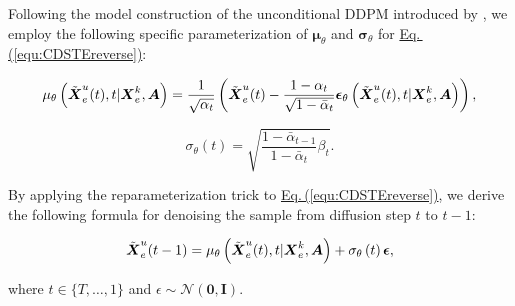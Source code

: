 \documentclass[a4paper,fleqn,12pt]{cas-sc}
\begin{document}
Following the model construction of the unconditional DDPM introduced by \cite{ho2020denoising}, we employ the following specific parameterization of $\boldsymbol{\mu}_{\theta}$ and $\boldsymbol{\sigma}_{\theta}$ for \hyperref[equ:CDSTEreverse]{Eq.\,(\ref{equ:CDSTEreverse})}:
\begin{linenomath*}
\begin{equation}\mu_\theta\left(\Tilde{\boldsymbol{X}}^{u}_{e}(t), t | \boldsymbol{X}^{k}_{e}, \boldsymbol{A}\right)=\frac{1}{\sqrt{\alpha_t}}\left(\Tilde{\boldsymbol{X}}^{u}_{e}(t)-\frac{1-\alpha_t}{\sqrt{1-\bar{\alpha}_t}} \boldsymbol{\epsilon}_\theta\left(\Tilde{\boldsymbol{X}}^{u}_{e}(t), t | \boldsymbol{X}^{k}_{e}, \boldsymbol{A}\right)\right),
\label{equ:DDPMmu}
\end{equation}
\end{linenomath*}

\begin{linenomath*}
\begin{equation}
\sigma_\theta\left(t\right)=\sqrt{\frac{1-\bar{\alpha}_{t-1}}{1-\bar{\alpha}_t} \beta_t}.
\label{equ:DDPMsigma}
\end{equation}
\end{linenomath*}

By applying the reparameterization trick to \hyperref[equ:CDSTEreverse]{Eq.\,(\ref{equ:CDSTEreverse})}, we derive the following formula for denoising the sample from diffusion step $t$ to $t-1$:
\begin{linenomath*}
\begin{equation}
\Tilde{\boldsymbol{X}}^{u}_{e}(t-1)=\mu_\theta\left(\Tilde{\boldsymbol{X}}^{u}_{e}(t), t | \boldsymbol{X}^{k}_{e}, \boldsymbol{A}\right) + \sigma_\theta\left(t\right)\boldsymbol{\epsilon},
\label{equ:reverseUpdate}
\end{equation}
\end{linenomath*}
where $t \in \{T,\ldots,1\}$ and $\epsilon\sim \mathcal{N}\left(\boldsymbol{0},\boldsymbol{I}\right)$. 
\end{document}
